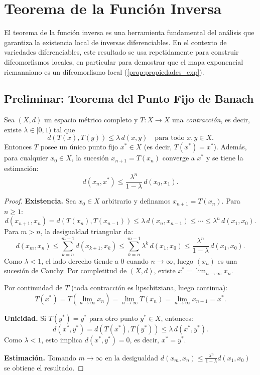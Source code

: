 
\section{Teorema de la Función Inversa}\label{sec:funcion_inversa}

El teorema de la función inversa es una herramienta fundamental del análisis que garantiza la existencia local de inversas diferenciables. En el contexto de variedades diferenciables, este resultado se usa repetidamente para construir difeomorfismos locales, en particular para demostrar que el mapa exponencial riemanniano es un difeomorfismo local (\autoref{prop:propiedades_exp}).

\subsection{Preliminar: Teorema del Punto Fijo de Banach}\label{subsec:punto_fijo_banach}

\begin{theorem}\label{thm:punto_fijo_banach}
Sea $(X, d)$ un espacio métrico completo y $T: X \to X$ una \textit{contracción}, es decir, existe $\lambda \in [0, 1)$ tal que
\[
d(T(x), T(y)) \leq \lambda \, d(x, y) \quad \text{para todo } x, y \in X.
\]
Entonces $T$ posee un único punto fijo $x^* \in X$ (es decir, $T(x^*) = x^*$). Además, para cualquier $x_0 \in X$, la sucesión $x_{n+1} = T(x_n)$ converge a $x^*$ y se tiene la estimación:
\[
d(x_n, x^*) \leq \frac{\lambda^n}{1 - \lambda} \, d(x_0, x_1).
\]
\end{theorem}

\begin{proof}
\textbf{Existencia.} Sea $x_0 \in X$ arbitrario y definamos $x_{n+1} = T(x_n)$. Para $n \geq 1$:
\[
d(x_{n+1}, x_n) = d(T(x_n), T(x_{n-1})) \leq \lambda \, d(x_n, x_{n-1}) \leq \cdots \leq \lambda^n \, d(x_1, x_0).
\]
Para $m > n$, la desigualdad triangular da:
\[
d(x_m, x_n) \leq \sum_{k=n}^{m-1} d(x_{k+1}, x_k) \leq \sum_{k=n}^{m-1} \lambda^k \, d(x_1, x_0) \leq \frac{\lambda^n}{1 - \lambda} \, d(x_1, x_0).
\]
Como $\lambda < 1$, el lado derecho tiende a $0$ cuando $n \to \infty$, luego $(x_n)$ es una sucesión de Cauchy. Por completitud de $(X, d)$, existe $x^* = \lim_{n \to \infty} x_n$.

Por continuidad de $T$ (toda contracción es lipschitziana, luego continua):
\[
T(x^*) = T\!\left(\lim_{n \to \infty} x_n\right) = \lim_{n \to \infty} T(x_n) = \lim_{n \to \infty} x_{n+1} = x^*.
\]

\textbf{Unicidad.} Si $T(y^*) = y^*$ para otro punto $y^* \in X$, entonces:
\[
d(x^*, y^*) = d(T(x^*), T(y^*)) \leq \lambda \, d(x^*, y^*).
\]
Como $\lambda < 1$, esto implica $d(x^*, y^*) = 0$, es decir, $x^* = y^*$.

\textbf{Estimación.} Tomando $m \to \infty$ en la desigualdad $d(x_m, x_n) \leq \frac{\lambda^n}{1-\lambda} d(x_1, x_0)$ se obtiene el resultado.
\end{proof}


